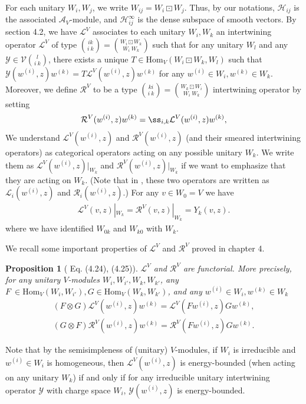 \documentclass[12pt,a4paper]{article}
\theoremstyle{definition}
\theoremstyle{plain}
\newtheorem{pp}[df]{Proposition}
\newcommand{\mc}{\mathcal}
\newcommand{\Hom}{\mathrm{Hom}}
\numberwithin{equation}{subsection}
\begin{document}
For each unitary $W_i,W_j$, we write $W_{ij}=W_i\boxdot W_j$. Thus, by our notations, $\mc H_{ij}$ is the associated $\mc A_V$-module, and $\mc H_{ij}^\infty$ is the dense subspace of smooth vectors. By \cite{Gui21a} section 4.2, we have $\mc L^V$ associates to each unitary $W_i,W_k$  an intertwining operator $\mc L^V$ of type ${ik\choose i~k}={W_i\boxdot W_k\choose W_i~W_k}$ such that for any unitary $W_l$ and any $\mc Y\in\mc V{l\choose i~k}$, there exists a unique $T\in\Hom_V(W_i\boxdot W_k,W_l)$ such that $\mc Y(w^{(i)},z)w^{(k)}=T\mc L^V(w^{(i)},z)w^{(k)}$ for any $w^{(i)}\in W_i,w^{(k)}\in W_k$. Moreover,  we define $\mc R^V$ to be a type ${ki\choose i~k}={W_k\boxdot W_i\choose W_i~W_k}$ intertwining operator by setting
\begin{align}
\mc R^V(w^{(i)},z)w^{(k)}=\ss_{i,k}\mc L^V(w^{(i)},z)w^{(k)},
\end{align}
We understand $\mc L^V(w^{(i)},z)$ and $\mc R^V(w^{(i)},z)$ (and their smeared intertwining operators) as categorical operators acting on any possible unitary $W_k$. We write them as $\mc L^V(w^{(i)},z)|_{W_k}$ and $\mc R^V(w^{(i)},z)|_{W_k}$ if we want to emphasize that they are acting on $W_k$. (Note that in \cite{Gui21a}, these two operators are written as $\mc L_i(w^{(i)},z)$ and $\mc R_i(w^{(i)},z)$.) For any $v\in W_0=V$ we have
\begin{align}
\mc L^V(v,z)|_{W_k}=\mc R^V(v,z)|_{W_k}=Y_k(v,z).
\end{align}
where we have identified $W_{0k}$ and $W_{k0}$ with $W_k$.

We recall some important properties of $\mc L^V$ and $\mc R^V$ proved in \cite{Gui21a} chapter 4.

\begin{pp}[\cite{Gui21a} Eq. (4.24), (4.25)]\label{lb57}
$\mc L^V$ and $\mc R^V$ are functorial. More precisely, for any unitary $V$-modules $W_i,W_{i'},W_k,W_{k'}$, any $F\ \in\Hom_V(W_i,W_{i'}),G\in\Hom_V(W_k,W_{k'})$, and any $w^{(i)}\in W_i,w^{(k)}\in W_k$
\begin{gather}
(F\otimes G)\mc L^V(w^{(i)},z)w^{(k)}=\mc L^V(Fw^{(i)},z)Gw^{(k)},\label{eq70}\\
(G\otimes F)\mc R^V(w^{(i)},z)w^{(k)}=\mc R^V(Fw^{(i)},z)Gw^{(k)}.\label{eq74}
\end{gather}
\end{pp}


Note that by the semisimpleness of (unitary) $V$-modules, if $W_i$ is irreducible and $w^{(i)}\in W_i$ is homogeneous, then $\mc L^V(w^{(i)},z)$ is energy-bounded (when acting on any unitary $W_k$) if and only if  for any irreducible unitary intertwining operator $\mc Y$ with charge space $W_i$, $\mc Y(w^{(i)},z)$ is energy-bounded.
\end{document}
